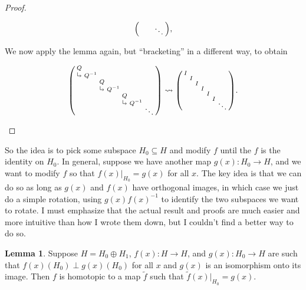 \documentclass{shortart}
\theoremstyle{definition}
\newtheorem*{lemma}{Lemma}
\newcommand\rotarrow{\begin{tikzpicture}\draw (0.15, 0) -- (0, 0) -- (0, 0.15); \draw (0.1, 0.05) -- (0.15, 0) -- (0.1, -0.05);\end{tikzpicture}}
\newcommand\id{I}
\newenvironment{psmallmatrix}
  {\left(\begin{smallmatrix}}
  {\end{smallmatrix}\right)}
\begin{document}
\begin{proof}
\begin{useimager}
\[\begin{psmallmatrix}
        & & & & & & \ddots
      \end{psmallmatrix},
    \]
  \end{useimager}
  We now apply the lemma again, but ``bracketing'' in a different way, to obtain
  \begin{useimager}
    \[
      \begin{psmallmatrix}
        Q \\
        \rotarrow & Q^{-1}\\
        & & Q\\
        & & \rotarrow & Q^{-1}\\
        & & & & Q\\
        & & & & \rotarrow & Q^{-1}\vspace{-5pt}\\
        & & & & & & \ddots
      \end{psmallmatrix}
      \rightsquigarrow
      \begin{psmallmatrix}
        \id \\
        & \id\\
        & & \id\\
        & & & \id\\
        & & & & \id\\
        & & & & & \id\vspace{-5pt}\\
        & & & & & & \ddots
      \end{psmallmatrix}.\qedshift
    \]
  \end{useimager}
\end{proof}

So the idea is to pick some subspace $H_0 \subseteq H$ and modify $f$ until the $f$ is the identity on $H_0$. In general, suppose we have another map $g(x): H_0 \to H$, and we want to modify $f$ so that $f(x)|_{H_0} = g(x)$ for all $x$. The key idea is that we can do so as long as $g(x)$ and $f(x)$ have orthogonal images, in which case we just do a simple rotation, using $g(x) f(x)^{-1}$ to identify the two subspaces we want to rotate. I must emphasize that the actual result and proofs are much easier and more intuitive than how I wrote them down, but I couldn't find a better way to do so.
\begin{lemma}
  Suppose $H = H_0 \oplus H_1$, $f(x): H \to H$, and $g(x): H_0 \to H$ are such that $f(x)(H_0) \perp g(x)(H_0)$ for all $x$ and $g(x)$ is an isomorphism onto its image. Then $f$ is homotopic to a map $\tilde{f}$ such that $\tilde{f}(x)|_{H_0} = g(x)$.
\end{lemma}
\end{document}
